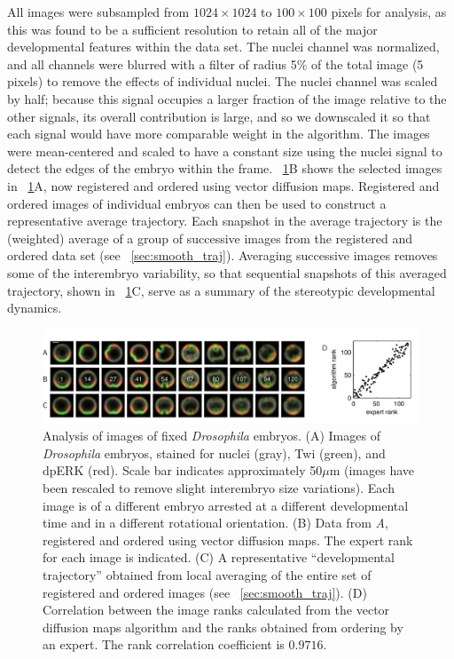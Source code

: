 All images were subsampled from $1024 \times 1024$ to $100 \times 100$ pixels for analysis, as this was found to be a sufficient resolution to retain all of the major developmental features within the data set.
%
The nuclei channel was normalized, and all channels were blurred with a filter of radius 5\% of the total image (5 pixels) to remove the effects of individual nuclei.
%
The nuclei channel was scaled by half; because this signal occupies a larger fraction of the image relative to the other signals, its overall contribution is large, and so we downscaled it so that each signal would have more comparable weight in the algorithm.
%
The images were mean-centered and scaled to have a constant size using the nuclei signal to detect the edges of the embryo within the frame.
%
\fig~\ref{fig:drosophila_fixed_images}B shows the selected images in \fig~\ref{fig:drosophila_fixed_images}A, now registered and ordered using vector diffusion maps.
%
Registered and ordered images of individual embryos can then be used to construct a representative average trajectory.
%
Each snapshot in the average trajectory is the (weighted) average of a group of successive images from the registered and ordered data set (see \sec~\ref{sec:smooth_traj}).
%
Averaging successive images removes some of the interembryo variability, so that sequential snapshots of this averaged trajectory, shown in \fig~\ref{fig:drosophila_fixed_images}C, serve as a summary of the stereotypic developmental dynamics.

\begin{figure}[t]
\includegraphics[width=\textwidth]{fig5}
\caption[Analysis of images of fixed \textit{Drosophila} embryos]{Analysis of images of fixed \textit{Drosophila} embryos. {(A)} Images of \textit{ Drosophila} embryos, stained for nuclei (gray), Twi (green), and dpERK (red). Scale bar indicates approximately 50$\mu$m (images have been rescaled to remove slight interembryo size variations).  Each image is of a different embryo arrested at a different developmental time and in a different rotational orientation. {(B)} Data from {\it A}, registered and ordered using vector diffusion maps. The expert rank for each image is indicated. {(C)} A representative ``developmental trajectory'' obtained from local averaging of the entire set of registered and ordered images (see \sec~\ref{sec:smooth_traj}). {(D)} Correlation between the image ranks calculated from the vector diffusion maps algorithm and the ranks obtained from ordering by an expert. The rank correlation coefficient is $0.9716$. }
\label{fig:drosophila_fixed_images}
\end{figure}


